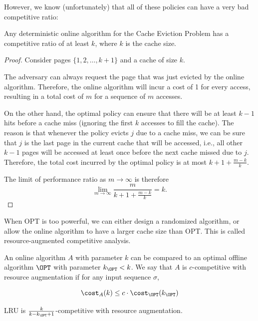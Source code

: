 However, we know (unfortunately) that all of these policies can have a very bad competitive ratio:

\begin{theorem}
	Any deterministic online algorithm for the Cache Eviction Problem has a competitive ratio of at least $k$, where $k$ is the cache size.
\end{theorem}

\begin{proof}
	Consider pages $\{1,2,\ldots,k+1\}$ and a cache of size $k$.

	The adversary can always request the page that was just evicted by the online algorithm. Therefore, the online algorithm will incur a cost of 1 for every access, resulting in a total cost of $m$ for a sequence of $m$ accesses.

	On the other hand, the optimal policy can ensure that there will be at least $k-1$ hits before a cache miss (ignoring the first $k$ accesses to fill the cache). The reason is that whenever the policy evicts $j$ due to a cache miss, we can be sure that $j$ is the last page in the current cache that will be accessed, i.e., all other $k-1$ pages will be accessed at least once before the next cache missed due to $j$. Therefore, the total cost incurred by the optimal policy is at most $k+1+\frac{m-k}{k}$.

	The limit of performance ratio as $m \to \infty$ is therefore
	\[ \lim_{m \to \infty} \frac{m}{k+1+\frac{m-k}{k}} = k. \]
\end{proof}

When OPT is too powerful, we can either design a randomized algorithm, or allow the online algorithm to have a larger cache size than OPT. This is called resource-augmented competitive analysis.

\begin{definition}
	An online algorithm $A$ with parameter $k$ can be compared to an optimal offline algorithm $\OPT$ with parameter $k_{\OPT} < k$. We say that $A$ is $c$-competitive with resource augmentation if for any input sequence $\sigma$,

	\[ \cost_A(k) \leq c \cdot \cost_{\OPT}(k_{\OPT}) \]
\end{definition}

\begin{theorem}
	LRU is $\frac{k}{k - k_{\OPT} + 1}$-competitive with resource augmentation.
\end{theorem}


